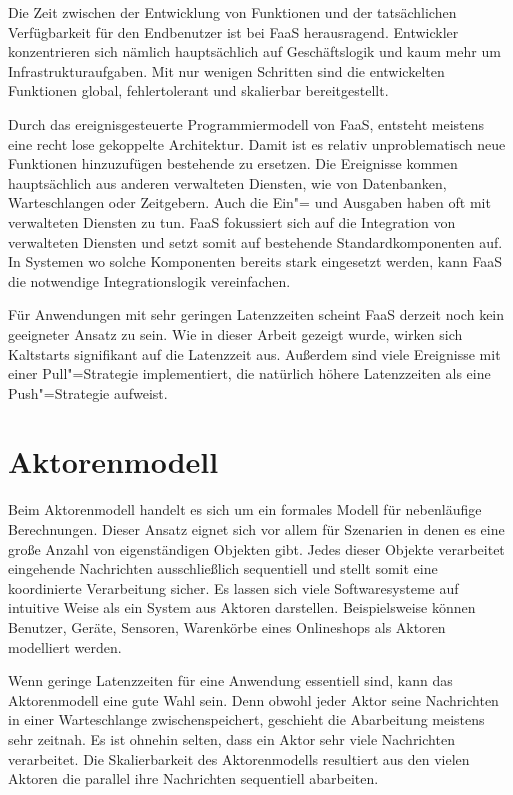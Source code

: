 Die Zeit zwischen der Entwicklung von Funktionen und der tatsächlichen Verfügbarkeit für den Endbenutzer ist bei FaaS herausragend. Entwickler konzentrieren sich nämlich hauptsächlich auf Geschäftslogik und kaum mehr um Infrastrukturaufgaben. Mit nur wenigen Schritten sind die entwickelten Funktionen global, fehlertolerant und skalierbar bereitgestellt.

Durch das ereignisgesteuerte Programmiermodell von FaaS, entsteht meistens eine recht lose gekoppelte Architektur. Damit ist es relativ unproblematisch neue Funktionen hinzuzufügen \bzw bestehende zu ersetzen. Die Ereignisse kommen hauptsächlich aus anderen verwalteten Diensten, wie \zB von Datenbanken, Warteschlangen oder Zeitgebern. Auch die Ein"= und Ausgaben haben oft mit verwalteten Diensten zu tun. \Dah FaaS fokussiert sich auf die Integration von verwalteten Diensten und setzt somit auf bestehende Standardkomponenten auf. In Systemen wo solche Komponenten bereits stark eingesetzt werden, kann FaaS die notwendige Integrationslogik vereinfachen.

Für Anwendungen mit sehr geringen Latenzzeiten scheint FaaS derzeit noch kein geeigneter Ansatz zu sein. Wie in dieser Arbeit gezeigt wurde, wirken sich Kaltstarts signifikant auf die Latenzzeit aus. Außerdem sind viele Ereignisse mit einer Pull"=Strategie implementiert, die natürlich höhere Latenzzeiten als eine Push"=Strategie aufweist.

\section{Aktorenmodell}

Beim Aktorenmodell handelt es sich um ein formales Modell für nebenläufige Berechnungen. Dieser Ansatz eignet sich vor allem für Szenarien in denen es eine große Anzahl von eigenständigen Objekten gibt. Jedes dieser Objekte verarbeitet eingehende Nachrichten ausschließlich sequentiell und stellt somit eine koordinierte Verarbeitung sicher. Es lassen sich viele Softwaresysteme auf intuitive Weise als ein System aus Aktoren darstellen. Beispielsweise können Benutzer, Geräte, Sensoren, Warenkörbe eines Onlineshops \usw als Aktoren modelliert werden.

Wenn geringe Latenzzeiten für eine Anwendung essentiell sind, kann das Aktorenmodell eine gute Wahl sein. Denn obwohl jeder Aktor seine Nachrichten in einer Warteschlange zwischenspeichert, geschieht die Abarbeitung meistens sehr zeitnah. Es ist ohnehin selten, dass ein Aktor sehr viele Nachrichten verarbeitet. Die Skalierbarkeit des Aktorenmodells resultiert aus den vielen Aktoren die parallel ihre Nachrichten sequentiell abarbeiten.


